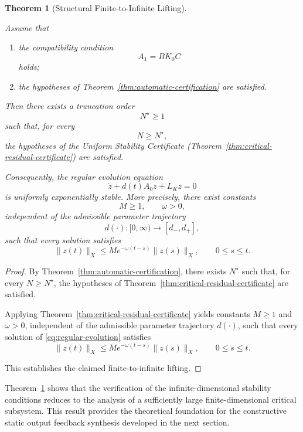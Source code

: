 \documentclass[pdflatex,sn-mathphys-num]{sn-jnl}
\theoremstyle{thmstyleone}%
\newtheorem{theorem}{Theorem}%
\theoremstyle{thmstyletwo}%
\theoremstyle{thmstylethree}%
\begin{document}
\begin{theorem}[Structural Finite-to-Infinite Lifting]
\label{thm:finite-to-infinite-lifting}

Assume that

\begin{enumerate}

\item
the compatibility condition
\[
A_1=BK_0C
\]
holds;

\item
the hypotheses of Theorem~\ref{thm:automatic-certification}
are satisfied.

\end{enumerate}

Then there exists a truncation order
\[
N^\star\ge1
\]
such that, for every
\[
N\ge N^\star,
\]
the hypotheses of the Uniform Stability Certificate (Theorem~\ref{thm:critical-residual-certificate})
are satisfied.

Consequently, the regular evolution equation
\begin{equation}
\dot z
+
d(t)A_0z
+
L_Kz
=
0
\label{eq:regular-evolution-lifting}
\end{equation}
is uniformly exponentially stable. More precisely, there exist constants
\[
M\ge1,
\qquad
\omega>0,
\]
independent of the admissible parameter trajectory
\[
d(\cdot):[0,\infty)\rightarrow[d_-,d_+],
\]
such that every solution satisfies
\[
\|z(t)\|_X
\le
Me^{-\omega(t-s)}
\|z(s)\|_X,
\qquad
0\le s\le t.
\]

\end{theorem}

\begin{proof}

By Theorem~\ref{thm:automatic-certification}, there exists \(N^\star\) such that, for every \(N\ge N^\star\), the hypotheses of Theorem~\ref{thm:critical-residual-certificate} are satisfied.

Applying Theorem~\ref{thm:critical-residual-certificate} yields constants \(M\ge1\) and \(\omega>0\), independent of the admissible parameter trajectory \(d(\cdot)\), such that every solution of
\eqref{eq:regular-evolution} satisfies
\[
\|z(t)\|_X
\le
Me^{-\omega(t-s)}
\|z(s)\|_X,
\qquad
0\le s\le t.
\]

This establishes the claimed finite-to-infinite lifting.

\end{proof}

Theorem~\ref{thm:finite-to-infinite-lifting}
shows that the verification of the infinite-dimensional stability conditions reduces to the analysis of a sufficiently large finite-dimensional critical subsystem. This result provides the theoretical foundation for the constructive static output feedback synthesis developed in the next section.
\end{document}
